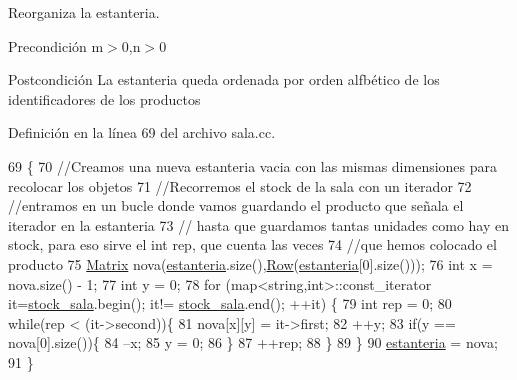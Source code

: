Reorganiza la estanteria. 

\begin{DoxyPrecond}{Precondición}
m$>$0,n$>$0 
\end{DoxyPrecond}
\begin{DoxyPostcond}{Postcondición}
La estanteria queda ordenada por orden alfbético de los identificadores de los productos 
\end{DoxyPostcond}


Definición en la línea 69 del archivo sala.\+cc.


\begin{DoxyCode}
69                        \{
70     \textcolor{comment}{//Creamos una nueva estanteria vacia con las mismas dimensiones para recolocar los objetos}
71     \textcolor{comment}{//Recorremos el stock de la sala con un iterador}
72     \textcolor{comment}{//entramos en un bucle donde vamos guardando el producto que señala el iterador en la estanteria}
73     \textcolor{comment}{// hasta que guardamos tantas unidades como hay en stock, para eso sirve el int rep, que cuenta las
       veces}
74     \textcolor{comment}{//que hemos colocado el producto}
75     \mbox{\hyperlink{almacen_8hh_acdf2b2dca71b1d617c96d1afa6a525fa}{Matrix}} nova(\mbox{\hyperlink{class_sala_a8f5264818c98db9c0d075c51a7672d95}{estanteria}}.size(),\mbox{\hyperlink{sala_8hh_aa33775a3e721e5fbd17b48a94ed3ca94}{Row}}(\mbox{\hyperlink{class_sala_a8f5264818c98db9c0d075c51a7672d95}{estanteria}}[0].size()));
76     \textcolor{keywordtype}{int} x = nova.size() - 1;
77     \textcolor{keywordtype}{int} y = 0;
78     \textcolor{keywordflow}{for} (map<string,int>::const\_iterator it=\mbox{\hyperlink{class_sala_a7c9511997ba4a6fac93625fd3f5c7703}{stock\_sala}}.begin(); it!=
      \mbox{\hyperlink{class_sala_a7c9511997ba4a6fac93625fd3f5c7703}{stock\_sala}}.end(); ++it) \{
79         \textcolor{keywordtype}{int} rep = 0;
80         \textcolor{keywordflow}{while}(rep < (it->second))\{
81             nova[x][y] = it->first;
82             ++y;
83             \textcolor{keywordflow}{if}(y == nova[0].size())\{
84                 --x;
85                 y = 0;
86             \}
87             ++rep; 
88         \}
89     \}
90     \mbox{\hyperlink{class_sala_a8f5264818c98db9c0d075c51a7672d95}{estanteria}} = nova;   
91 \}
\end{DoxyCode}
\mbox{\label{class_sala_aa65c68be5f5242570063fc5f0e8dafa2}} 
